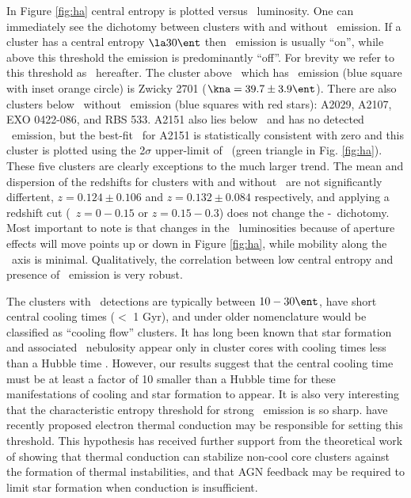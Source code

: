 \documentclass{emulateapj}
\begin{document}
In Figure \ref{fig:ha} central entropy is plotted versus
\halpha\ luminosity. One can immediately see the dichotomy between
clusters with and without \halpha\ emission. If a cluster has a
central entropy $\la 30 \ent$ then \halpha\ emission is usually
``on'', while above this threshold the emission is predominantly
``off''. For brevity we refer to this threshold as
\kthr\ hereafter. The cluster above \kthr\ which has \halpha\ emission
(blue square with inset orange circle) is Zwicky 2701 ($\kna = 39.7
\pm 3.9 \ent$). There are also clusters below \kthr\ without
\halpha\ emission (blue squares with red stars): A2029, A2107, EXO
0422-086, and RBS 533. A2151 also lies below \kthr\ and has no
detected \halpha\ emission, but the best-fit \kna\ for A2151 is
statistically consistent with zero and this cluster is plotted using
the 2$\sigma$ upper-limit of \kna\ (green triangle in
Fig. \ref{fig:ha}).  These five clusters are clearly exceptions to the
much larger trend. The mean and dispersion of the redshifts for
clusters with and without \halpha\ are not significantly differtent,
$z = 0.124 \pm 0.106$ and $z = 0.132 \pm 0.084$ respectively, and
applying a redshift cut (\ie\ $z = 0-0.15$ or $z = 0.15-0.3$) does not
change the \kna-\halpha\ dichotomy. Most important to note is that
changes in the \halpha\ luminosities because of aperture effects will
move points up or down in Figure \ref{fig:ha}, while mobility along
the \kna\ axis is minimal. Qualitatively, the correlation between low
central entropy and presence of \halpha\ emission is very robust.

The clusters with \halpha\ detections are typically between $10-30
\ent$, have short central cooling times ($<$ 1 Gyr), and under older
nomenclature would be classified as ``cooling flow'' clusters.  It has
long been known that star formation and associated \halpha\ nebulosity
appear only in cluster cores with cooling times less than a Hubble
time \citep{hu85, johnstone87, mcnamara89, voit97,cardiel98}. However,
our results suggest that the central cooling time must be at least a
factor of 10 smaller than a Hubble time for these manifestations of
cooling and star formation to appear.  It is also very interesting
that the characteristic entropy threshold for strong \halpha\ emission
is so sharp. \cite{conduction} have recently proposed electron thermal
conduction may be responsible for setting this threshold. This
hypothesis has received further support from the theoretical work of
\cite{2008arXiv0804.3823G} showing that thermal conduction can
stabilize non-cool core clusters against the formation of thermal
instabilities, and that AGN feedback may be required to limit star
formation when conduction is insufficient.
\end{document}
